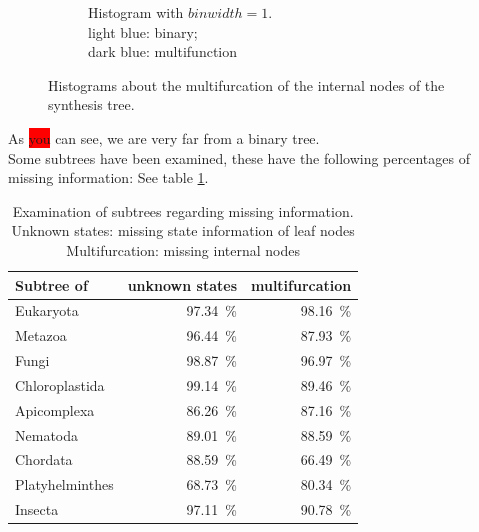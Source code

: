 \begin{figure}[h!]
\begin{subfigure}[b]{0.42\textwidth}
        \caption{Histogram with $binwidth = 1$. \\ light blue: binary; \\ dark blue: multifunction}
      \end{subfigure}
      \caption{Histograms about the multifurcation of the internal nodes of the synthesis tree.}
      \label{fig:childrenOfNodes}
    \end{figure}
    As \colorbox{red}{you} can see, we are very far from a binary tree. \\
    Some subtrees have been examined, these have the following percentages of missing information: See 
      table \ref{table:percentage loss information subtrees}.
    \begin{table}[h!]
      \begin{center}
        \begin{tabular}{ |l||r|r| }
          \hline
          Subtree of & unknown states & multifurcation \\ 
          \hline \hline
          Eukaryota       & 97.34~\%  & 98.16~\% \\
          \hline \hline
          Metazoa         & 96.44~\%  & 87.93~\% \\ \hline
          Fungi           & 98.87~\%  & 96.97~\% \\ \hline
          Chloroplastida  & 99.14~\%  & 89.46~\% \\
          \hline \hline            
          Apicomplexa     & 86.26~\%  & 87.16~\% \\ \hline
          Nematoda        & 89.01~\%  & 88.59~\% \\ \hline
          Chordata        & 88.59~\%  & \cellcolor{green!50}66.49~\% \\ \hline
          Platyhelminthes & \cellcolor{green!50}68.73~\%  & 80.34~\% \\
          \hline \hline            
          Insecta         & 97.11~\%  & 90.78~\% \\
          \hline  
        \end{tabular}
      \end{center}
      \caption{Examination of subtrees regarding missing information. \\ 
        Unknown states: missing state information of leaf nodes \\ 
        Multifurcation: missing internal nodes}
      \label{table:percentage loss information subtrees} 
    \end{table}

